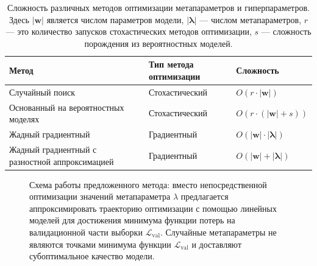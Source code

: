 \documentclass[12pt]{a&t}
\begin{document}
\begin{table}[]
\caption{Сложность различных методов оптимизации метапараметров и гиперпараметров. Здесь $|\mathbf{w}|$ является числом параметров модели, $|\boldsymbol{\lambda}|$ --- числом метапараметров, $r$ --- это количество запусков стохастических методов оптимизации, $s$ --- сложность порождения из вероятностных моделей.}
\centering
\begin{tabularx}{\textwidth}{X|X|X} \hline
\bf {Метод} & \bf {Тип метода оптимизации}  & \bf{Сложность}  \\ \hline \hline 
Случайный поиск~\cite{bergstra2012random} & Стохастический & $O(r\cdot|\mathbf{w}|)$      \\ \hline
Основанный на вероятностных моделях~\cite{bergstra2013making}  & Стохастический                                    & $O\left(r \cdot \left(|\mathbf{w}| + s\right)\right)$               \\ \hline
Жадный градиентный~\cite{journals/corr/LuketinaBR15}                    & Градиентный                                &$O(|\mathbf{w}|\cdot|\boldsymbol{\lambda}|)$    \\ \hline
Жадный градиентный с разностной аппроксимацией~\cite{liu2018darts} & Градиентный                                & $O(|\mathbf{w}| + |\boldsymbol{\lambda}|)$   \\ \hline
\end{tabularx}
\vspace{0.2cm}
\label{table:compl}

\end{table}

\begin{figure}[ht]
    \caption{Схема работы предложенного метода: вместо непосредственной оптимизации значений метапараметра $\lambda$ предлагается аппроксимировать траекторию оптимизации с помощью линейных моделей для достижения минимума функции потерь на валидационной части выборки $\mathcal{L}_\text{val}$. Случайные метапараметры не являются точками минимума функции $\mathcal{L}_\text{val}$ и доставляют субоптимальное качество модели.}
    \label{fig:trajectory}
\end{figure}
\end{document}
